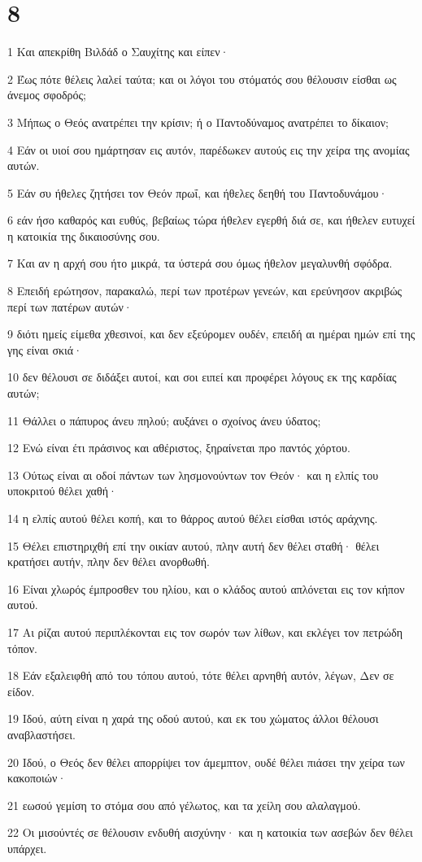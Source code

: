 \chapter{8}

\par 1 Και απεκρίθη Βιλδάδ ο Σαυχίτης και είπεν·
\par 2 Έως πότε θέλεις λαλεί ταύτα; και οι λόγοι του στόματός σου θέλουσιν είσθαι ως άνεμος σφοδρός;
\par 3 Μήπως ο Θεός ανατρέπει την κρίσιν; ή ο Παντοδύναμος ανατρέπει το δίκαιον;
\par 4 Εάν οι υιοί σου ημάρτησαν εις αυτόν, παρέδωκεν αυτούς εις την χείρα της ανομίας αυτών.
\par 5 Εάν συ ήθελες ζητήσει τον Θεόν πρωΐ, και ήθελες δεηθή του Παντοδυνάμου·
\par 6 εάν ήσο καθαρός και ευθύς, βεβαίως τώρα ήθελεν εγερθή διά σε, και ήθελεν ευτυχεί η κατοικία της δικαιοσύνης σου.
\par 7 Και αν η αρχή σου ήτο μικρά, τα ύστερά σου όμως ήθελον μεγαλυνθή σφόδρα.
\par 8 Επειδή ερώτησον, παρακαλώ, περί των προτέρων γενεών, και ερεύνησον ακριβώς περί των πατέρων αυτών·
\par 9 διότι ημείς είμεθα χθεσινοί, και δεν εξεύρομεν ουδέν, επειδή αι ημέραι ημών επί της γης είναι σκιά·
\par 10 δεν θέλουσι σε διδάξει αυτοί, και σοι ειπεί και προφέρει λόγους εκ της καρδίας αυτών;
\par 11 Θάλλει ο πάπυρος άνευ πηλού; αυξάνει ο σχοίνος άνευ ύδατος;
\par 12 Ενώ είναι έτι πράσινος και αθέριστος, ξηραίνεται προ παντός χόρτου.
\par 13 Ούτως είναι αι οδοί πάντων των λησμονούντων τον Θεόν· και η ελπίς του υποκριτού θέλει χαθή·
\par 14 η ελπίς αυτού θέλει κοπή, και το θάρρος αυτού θέλει είσθαι ιστός αράχνης.
\par 15 Θέλει επιστηριχθή επί την οικίαν αυτού, πλην αυτή δεν θέλει σταθή· θέλει κρατήσει αυτήν, πλην δεν θέλει ανορθωθή.
\par 16 Είναι χλωρός έμπροσθεν του ηλίου, και ο κλάδος αυτού απλόνεται εις τον κήπον αυτού.
\par 17 Αι ρίζαι αυτού περιπλέκονται εις τον σωρόν των λίθων, και εκλέγει τον πετρώδη τόπον.
\par 18 Εάν εξαλειφθή από του τόπου αυτού, τότε θέλει αρνηθή αυτόν, λέγων, Δεν σε είδον.
\par 19 Ιδού, αύτη είναι η χαρά της οδού αυτού, και εκ του χώματος άλλοι θέλουσι αναβλαστήσει.
\par 20 Ιδού, ο Θεός δεν θέλει απορρίψει τον άμεμπτον, ουδέ θέλει πιάσει την χείρα των κακοποιών·
\par 21 εωσού γεμίση το στόμα σου από γέλωτος, και τα χείλη σου αλαλαγμού.
\par 22 Οι μισούντές σε θέλουσιν ενδυθή αισχύνην· και η κατοικία των ασεβών δεν θέλει υπάρχει.

